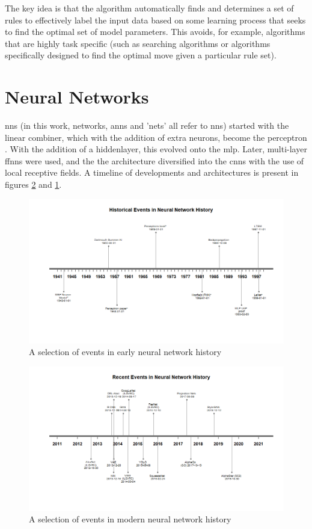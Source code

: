 The key idea is that the algorithm automatically finds and determines a set of rules to effectively label the input data based on some learning process that seeks to find the optimal set of model parameters. This avoids, for example, algorithms that are highly task specific (such as searching algorithms or algorithms specifically designed to find the optimal move given a particular rule set). \bigskip

\section{Neural Networks} 


\gls{nn}s (in this work, networks, \gls{ann}s and 'nets' all refer to \gls{nn}s) started with the linear combiner, which with the addition of extra neurons, become the perceptron \cite{haykin}. With the addition of a \gls{hiddenlayer}, this evolved onto the \gls{mlp}. Later, multi-layer \gls{ffnn}s were used, and the the architecture diversified into the \gls{cnn}s with the use of local receptive fields. A timeline of developments and architectures is present in figures \ref{fig:timeline_new_nn} and \ref{fig:timeline_old_nn}. \bigskip

\begin{figure}
    \centering
    \includegraphics[width=120mm,scale=1.5]{figs/timeline_old_nn.png}
    \caption{A selection of events in early neural network history}
    \label{fig:timeline_old_nn}
\end{figure}

\begin{figure}
    \centering
    \includegraphics[width=120mm,scale=1.5]{figs/timeline_new_nn.png}
    \caption{A selection of events in modern neural network history}
    \label{fig:timeline_new_nn}
\end{figure}

